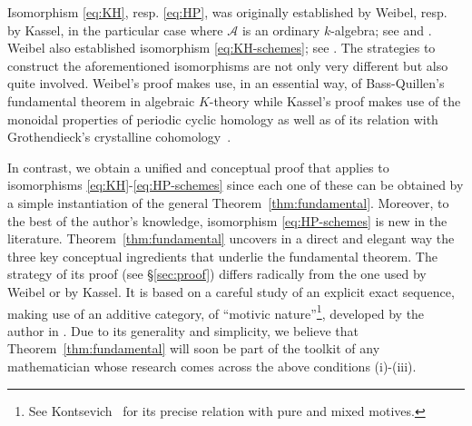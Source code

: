 \documentclass{amsart}
\numberwithin{equation}{subsection}
\theoremstyle{remark}
\theoremstyle{remark}
\theoremstyle{remark}
\theoremstyle{remark}
\begin{document}
Isomorphism \eqref{eq:KH}, resp. \eqref{eq:HP}, was originally established by Weibel, resp. by Kassel, in the particular case where ${{\mathcal A}}$ is an ordinary $k$-algebra; see \cite[Theorem~1.2]{Weibel-KH} and \cite[Corollary~3.12]{Kassel}. Weibel also established isomorphism \eqref{eq:KH-schemes}; see \cite[Theorem~6.11]{Weibel-KH}. The strategies to construct the aforementioned isomorphisms are not only very different but also quite involved. Weibel's proof makes use, in an essential way, of Bass-Quillen's fundamental theorem in algebraic $K$-theory while Kassel's proof makes use of the monoidal properties of periodic cyclic homology as well as of its relation with Grothendieck's crystalline cohomology~\cite{Grot}.

In contrast, we obtain a unified and conceptual proof that applies to isomorphisms \eqref{eq:KH}-\eqref{eq:HP-schemes} since each one of these can be obtained by a simple instantiation of the general Theorem~\ref{thm:fundamental}. Moreover, to the best of the author's knowledge, isomorphism \eqref{eq:HP-schemes} is new in the literature. Theorem~\ref{thm:fundamental} uncovers in a direct and elegant way the three key conceptual ingredients that underlie the fundamental theorem. The strategy of its proof (see \S\ref{sec:proof}) differs radically from the one used by Weibel or by Kassel. It is based on a careful study of an explicit exact sequence, making use of an additive category, of ``motivic nature''\footnote{See Kontsevich~\cite[\S4.1.3]{finMot} for its precise relation with pure and mixed motives.}, developed by the author in \cite{IMRN}. Due to its generality and simplicity, we believe that Theorem~\ref{thm:fundamental} will soon be part of the toolkit of any mathematician whose research comes across the above conditions (i)-(iii).
\end{document}
